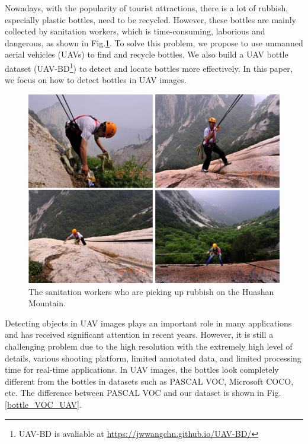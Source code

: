 \label{sec:intro}


Nowadays, with the popularity of tourist attractions, there is a lot of rubbish, especially plastic bottles, need to be recycled. However, these bottles are mainly collected by sanitation workers, which is time-consuming, laborious and dangerous, as shown in Fig.\ref{fig:sanitation_worker}. To solve this problem, we propose to use unmanned aerial vehicles (UAVs) to find and recycle bottles. We also build a UAV bottle dataset (UAV-BD\footnote{UAV-BD is avaliable at \url{https://jwwangchn.github.io/UAV-BD/}}) to detect and locate bottles more effectively. In this paper, we focus on how to detect bottles in UAV images.


\begin{figure}
	\includegraphics[width=\linewidth]{images/sanitation_worker.png}
	\caption{The sanitation workers who are picking up rubbish on the Huashan Mountain\protect\footnotemark.}
	\label{fig:sanitation_worker}
\end{figure}





Detecting objects in UAV images plays an important role in many applications and has received significant attention in recent years\cite{UAV2}. However, it is still a challenging problem due to the high resolution with the extremely high level of details, various shooting platform, limited annotated data, and limited processing time for real-time applications\cite{car_detection}. In UAV images, the bottles look completely different from the bottles in datasets such as PASCAL VOC\cite{PASCALVOC}, Microsoft COCO\cite{COCO}, etc. The difference between PASCAL VOC and our dataset is shown in Fig.\ref{bottle_VOC_UAV}.

